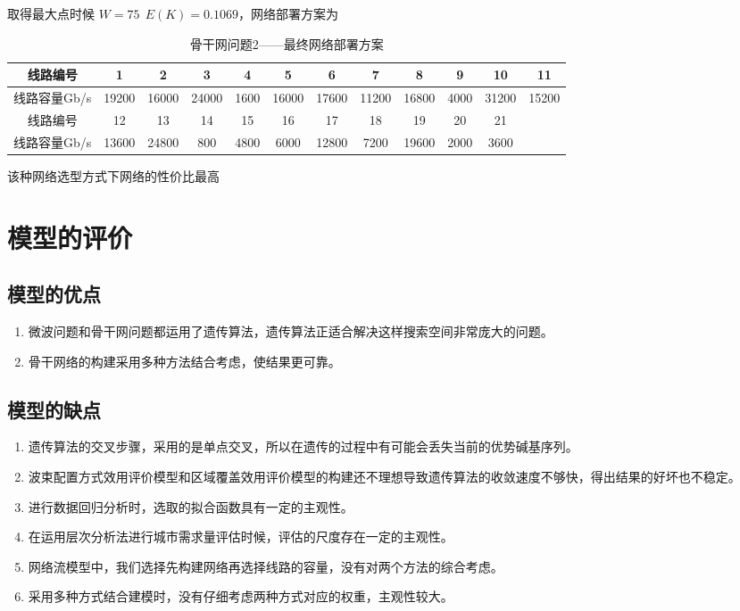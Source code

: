\documentclass[UTF8,12pt]{ctexart}
\begin{document}
取得最大点时候 $W=75~~E(K)=0.1069$，网络部署方案为
\begin{table}[htbp]
    \centering
    \caption{骨干网问题2——最终网络部署方案}
    \begin{scriptsize}
        \begin{tabular}{cccccccccccc}
            \toprule
            线路编号     & 1     & 2     & 3     & 4    & 5     & 6     & 7     & 8     & 9    & 10    & 11    \\
            \midrule
            线路容量Gb/s & 19200 & 16000 & 24000 & 1600 & 16000 & 17600 & 11200 & 16800 & 4000 & 31200 & 15200 \\
            \midrule
            线路编号     & 12    & 13    & 14    & 15   & 16    & 17    & 18    & 19    & 20   & 21    &       \\
            \midrule
            线路容量Gb/s & 13600 & 24800 & 800   & 4800 & 6000  & 12800 & 7200  & 19600 & 2000 & 3600  &       \\
            \bottomrule
        \end{tabular}%
    \end{scriptsize}
\end{table}%

该种网络选型方式下网络的性价比最高
\newpage
\section{模型的评价}
\subsection{模型的优点}
\begin{enumerate}
    \item 微波问题和骨干网问题都运用了遗传算法，遗传算法正适合解决这样搜索空间非常庞大的问题。
    \item 骨干网络的构建采用多种方法结合考虑，使结果更可靠。
\end{enumerate}
\subsection{模型的缺点}
\begin{enumerate}
    \item 遗传算法的交叉步骤，采用的是单点交叉，所以在遗传的过程中有可能会丢失当前的优势碱基序列。
    \item 波束配置方式效用评价模型和区域覆盖效用评价模型的构建还不理想导致遗传算法的收敛速度不够快，得出结果的好坏也不稳定。
    \item 进行数据回归分析时，选取的拟合函数具有一定的主观性。
    \item 在运用层次分析法进行城市需求量评估时候，评估的尺度存在一定的主观性。
    \item 网络流模型中，我们选择先构建网络再选择线路的容量，没有对两个方法的综合考虑。
    \item 采用多种方式结合建模时，没有仔细考虑两种方式对应的权重，主观性较大。
\end{enumerate}
\end{document}
